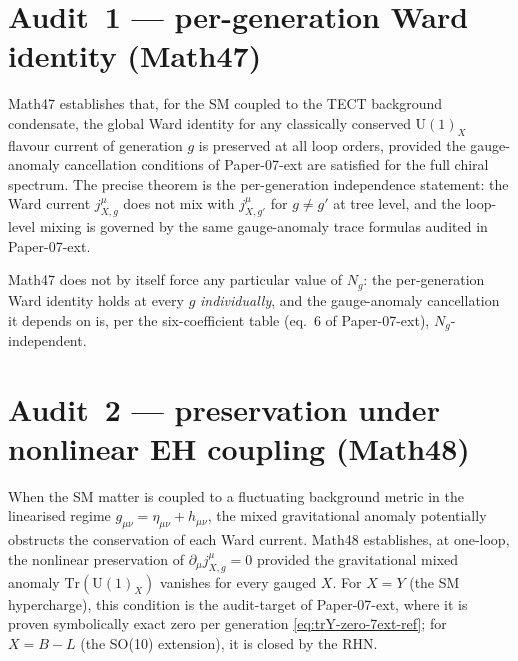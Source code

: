 \section{Audit~1 --- per-generation Ward identity (Math47)}
\label{sec:ward}
Math47 establishes that, for the SM coupled to the TECT background
condensate, the global Ward identity for any classically conserved
$\mathrm{U}(1)_X$ flavour current of generation $g$ is preserved at
all loop orders, provided the gauge-anomaly cancellation conditions
of Paper-07-ext are satisfied for the full chiral spectrum. The
precise theorem is the per-generation independence statement: the
Ward current $j^{\mu}_{X,g}$ does not mix with $j^{\mu}_{X,g'}$ for
$g\neq g'$ at tree level, and the loop-level mixing is governed by
the same gauge-anomaly trace formulas audited in Paper-07-ext.

\begin{remark}
\label{rmk:math47-limits}
Math47 does not by itself force any particular value of $N_g$: the
per-generation Ward identity holds at every $g$ \emph{individually},
and the gauge-anomaly cancellation it depends on is, per
the six-coefficient table (eq.~6 of Paper-07-ext), $N_g$-independent.
\end{remark}

\section{Audit~2 --- preservation under nonlinear EH coupling
(Math48)}\label{sec:eh}
When the SM matter is coupled to a fluctuating background metric in
the linearised regime $g_{\mu\nu} = \eta_{\mu\nu} + h_{\mu\nu}$, the
mixed gravitational anomaly potentially obstructs the conservation of
each Ward current. Math48 establishes, at one-loop, the nonlinear
preservation of $\partial_\mu j^{\mu}_{X,g} = 0$ provided the
gravitational mixed anomaly $\mathrm{Tr}(\mathrm{U}(1)_X)$ vanishes
for every gauged $X$. For $X = Y$ (the SM hypercharge), this
condition is the audit-target of Paper-07-ext, where it is proven
symbolically exact zero per generation
\eqref{eq:trY-zero-7ext-ref}; for $X = B-L$ (the SO(10) extension),
it is closed by the RHN.


